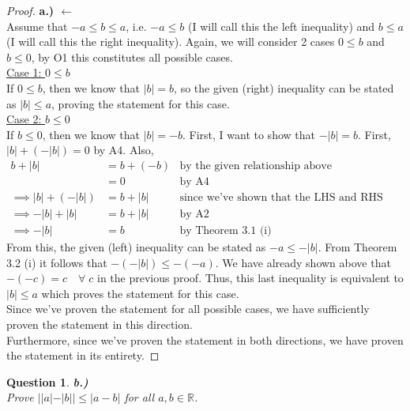 \documentclass[10pt,a4paper]{article}
\newtheorem*{question*}{Question}
\theoremstyle{definition}
\begin{document}
\begin{proof}{\textbf{a.) $\leftarrow$}}
\\Assume that $-a \leq b \leq a$, i.e. $-a \leq b$ (I will call this the left inequality) and $b \leq a$ (I will call this the right inequality). Again, we will consider 2 cases $0 \leq b$ and $b \leq 0$, by O1 this constitutes all possible cases.
\\\underline{Case 1: $0 \leq b$}
\\If $0 \leq b$, then we know that $|b| = b$, so the given (right) inequality can be stated as $|b| \leq a$, proving the statement for this case.
\\\underline{Case 2: $b \leq 0$}
\\If $b \leq 0$, then we know that $|b| = -b$. First, I want to show that $-|b| = b$. First, $|b| + (-|b|) = 0$ by A4. Also,
\begin{align*}
b + |b| &= b + (-b) &\text{by the given relationship above}\\
&= 0 &\text{by A4}\\
\implies |b| + (-|b|) &= b + |b| &\text{since we've shown that the LHS and RHS are equal to 0}\\
\implies -|b| + |b| &= b + |b| &\text{by A2}\\
\implies -|b| &= b &\text{by Theorem 3.1 (i)}
\end{align*}
From this, the given (left) inequality can be stated as $-a \leq -|b|$. From Theorem 3.2 (i) it follows that $-(-|b|) \leq -(-a)$. We have already shown above that $-(-c) = c \quad \forall \; c$ in the previous proof. Thus, this last inequality is equivalent to $|b| \leq a$ which proves the statement for this case.
\\Since we've proven the statement for all possible cases, we have sufficiently proven the statement in this direction. 
\\Furthermore, since we've proven the statement in both directions, we have proven the statement in its entirety. 
\end{proof}

\begin{question*}{\textbf{b.)}}
\\Prove $||a| - |b|| \leq |a - b|$ for all $a, b \in \mathbb{R}$.
\end{question*}
\end{document}
